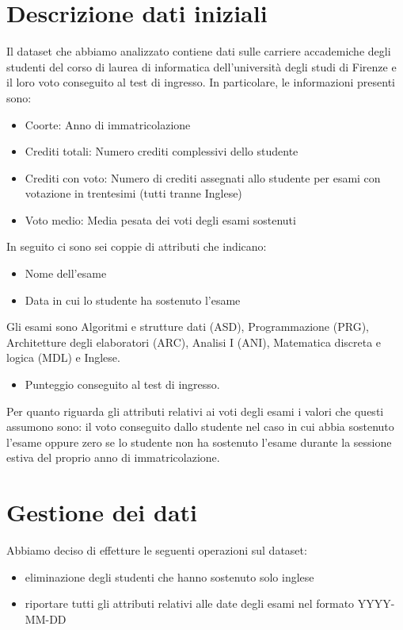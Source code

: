 \documentclass[12pt]{article}
\begin{document}
\section{Descrizione dati iniziali}
Il dataset che abbiamo analizzato contiene dati sulle carriere accademiche degli studenti del corso di laurea di informatica dell'università degli studi di Firenze e il loro voto conseguito 
al test di ingresso. 
In particolare, le informazioni presenti sono:
\begin{itemize}
	\item Coorte: Anno di immatricolazione
	\item Crediti totali: Numero crediti complessivi dello studente
	\item Crediti con voto: Numero di crediti assegnati allo studente per esami con votazione in trentesimi (tutti tranne Inglese)
	\item Voto medio: Media pesata dei voti degli esami sostenuti
\end{itemize}
In seguito ci sono sei coppie di attributi che indicano:
\begin{itemize}
	\item Nome dell'esame
	\item Data in cui lo studente ha sostenuto l'esame
\end{itemize}
Gli esami sono Algoritmi e strutture dati (ASD), Programmazione (PRG), Architetture degli elaboratori (ARC), Analisi I (ANI), Matematica discreta e logica (MDL) e Inglese.
\begin{itemize}
	\item Punteggio conseguito al test di ingresso.
\end{itemize}
Per quanto riguarda gli attributi relativi ai voti degli esami i valori che questi assumono sono:
il voto conseguito dallo studente nel caso in cui abbia sostenuto l'esame oppure
zero se lo studente non ha sostenuto l'esa\-me durante la sessione estiva del proprio anno di immatricolazione.
\section{Gestione dei dati}
Abbiamo deciso di effetture le seguenti operazioni sul dataset:
\begin{itemize}
	\item eliminazione degli studenti che hanno sostenuto solo inglese
	\item riportare tutti gli attributi relativi alle date degli esami nel formato YYYY-MM-DD
\end{itemize}
\end{document}
